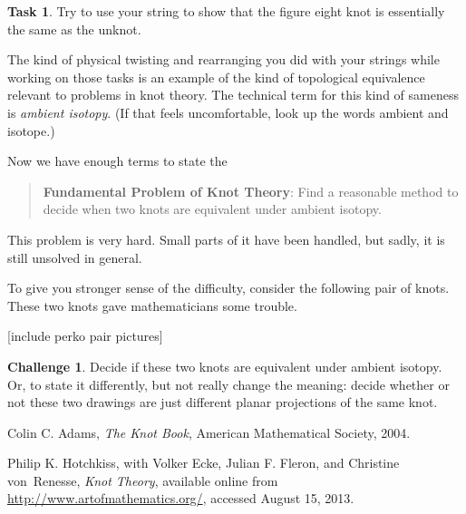 \documentclass[12pt,letterpaper]{article}
\theoremstyle{definition}
\newtheorem*{challenge}{Challenge}
\newtheorem{task}[question]{Task}
\begin{document}
\begin{task}
Try to use your string to show that the figure eight knot is essentially the same as the unknot.
\end{task}

The kind of physical twisting and rearranging you did with your strings while working on those tasks is an example of the kind of topological equivalence relevant to problems in knot theory. The technical term for this kind of sameness is \emph{ambient isotopy}. (If that feels uncomfortable, look up the words ambient and isotope.)

Now we have enough terms to state the 
\begin{quote}
\textbf{Fundamental Problem of Knot Theory}: Find a reasonable method to decide when two knots are equivalent under ambient isotopy.
\end{quote}

This problem is very hard.
Small parts of it have been handled, but sadly, it is still unsolved in general.

To give you stronger sense of the difficulty, consider the following pair of knots. These two knots gave mathematicians some trouble.

[include perko pair pictures]

\begin{challenge}
Decide if these two knots are equivalent under ambient isotopy.
Or, to state it differently, but not really change the meaning: decide whether or not these two drawings are just different planar projections of the same knot.
\end{challenge}


\begin{thebibliography}{9}

	Colin C. Adams,
	\emph{The Knot Book},
	American Mathematical Society, 
	2004.

	Philip K. Hotchkiss, with Volker Ecke, Julian F. Fleron, and Christine von~Renesse,
	\emph{Knot Theory},
	available online from \url{http://www.artofmathematics.org/}, 
	accessed August 15, 2013.

\end{thebibliography}
\end{document}
